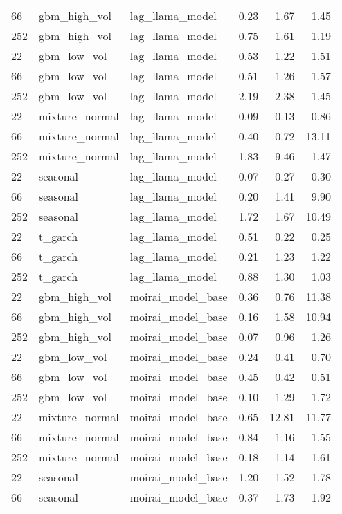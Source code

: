 {\begin{tabular}{lllrrr}
66 & gbm\_high\_vol & lag\_llama\_model & 0.23 & 1.67 & 1.45 \\
252 & gbm\_high\_vol & lag\_llama\_model & 0.75 & 1.61 & 1.19 \\
\midrule
22 & gbm\_low\_vol & lag\_llama\_model & 0.53 & 1.22 & 1.51 \\
66 & gbm\_low\_vol & lag\_llama\_model & 0.51 & 1.26 & 1.57 \\
252 & gbm\_low\_vol & lag\_llama\_model & 2.19 & 2.38 & 1.45 \\
\midrule
22 & mixture\_normal & lag\_llama\_model & 0.09 & 0.13 & 0.86 \\
66 & mixture\_normal & lag\_llama\_model & 0.40 & 0.72 & 13.11 \\
252 & mixture\_normal & lag\_llama\_model & 1.83 & 9.46 & 1.47 \\
\midrule
22 & seasonal & lag\_llama\_model & 0.07 & 0.27 & 0.30 \\
66 & seasonal & lag\_llama\_model & 0.20 & 1.41 & 9.90 \\
252 & seasonal & lag\_llama\_model & 1.72 & 1.67 & 10.49 \\
\midrule
22 & t\_garch & lag\_llama\_model & 0.51 & 0.22 & 0.25 \\
66 & t\_garch & lag\_llama\_model & 0.21 & 1.23 & 1.22 \\
252 & t\_garch & lag\_llama\_model & 0.88 & 1.30 & 1.03 \\
\midrule
22 & gbm\_high\_vol & moirai\_model\_base & 0.36 & 0.76 & 11.38 \\
66 & gbm\_high\_vol & moirai\_model\_base & 0.16 & 1.58 & 10.94 \\
252 & gbm\_high\_vol & moirai\_model\_base & 0.07 & 0.96 & 1.26 \\
\midrule
22 & gbm\_low\_vol & moirai\_model\_base & 0.24 & 0.41 & 0.70 \\
66 & gbm\_low\_vol & moirai\_model\_base & 0.45 & 0.42 & 0.51 \\
252 & gbm\_low\_vol & moirai\_model\_base & 0.10 & 1.29 & 1.72 \\
\midrule
22 & mixture\_normal & moirai\_model\_base & 0.65 & 12.81 & 11.77 \\
66 & mixture\_normal & moirai\_model\_base & 0.84 & 1.16 & 1.55 \\
252 & mixture\_normal & moirai\_model\_base & 0.18 & 1.14 & 1.61 \\
\midrule
22 & seasonal & moirai\_model\_base & 1.20 & 1.52 & 1.78 \\
66 & seasonal & moirai\_model\_base & 0.37 & 1.73 & 1.92 \\

\end{tabular}}
